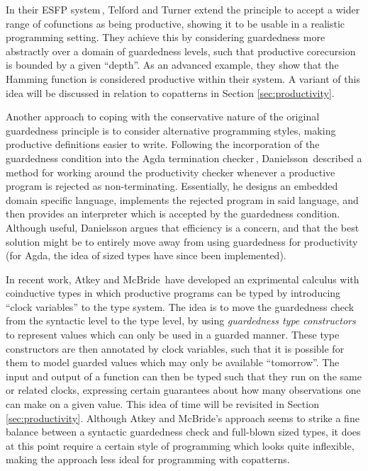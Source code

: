 In their ESFP system\,\citep{Telford97ensuringstreams,Telford98ensuringthe}, Telford and Turner extend the principle to accept a wider range of cofunctions as being productive, showing it to be usable in a realistic programming setting. They achieve this by considering guardedness more abstractly over a domain of guardedness levels, such that productive corecursion is bounded by a given ``depth''. As an advanced example, they show that the Hamming function is considered productive within their system. A variant of this idea will be discussed in relation to copatterns in Section \ref{sec:productivity}.

Another approach to coping with the conservative nature of the original guardedness principle is to consider alternative programming styles, making productive definitions easier to write. Following the incorporation of the guardedness condition into the Agda termination checker\,\citep{AltenkirchNAD10}, Danielsson\,\citep{Danielsson10beatingthe} described a method for working around the productivity checker whenever a productive program is rejected as non-terminating. Essentially, he designs an embedded domain specific language, implements the rejected program in said language, and then provides an interpreter which is accepted by the guardedness condition. Although useful, Danielsson argues that efficiency is a concern, and that the best solution might be to entirely move away from using guardedness for productivity (for Agda, the idea of sized types have since been implemented).

In recent work, Atkey and McBride\,\citep{AtkeyMcBride13} have developed an exprimental calculus with coinductive types in which productive programs can be typed by introducing ``clock variables'' to the type system. The idea is to move the guardedness check from the syntactic level to the type level, by using \emph{guardedness type constructors} to represent values which can only be used in a guarded manner. These type constructors are then annotated by clock variables, such that it is possible for them to model guarded values which may only be available ``tomorrow''. The input and output of a function can then be typed such that they run on the same or related clocks, expressing certain guarantees about how many observations one can make on a given value. This idea of time will be revisited in Section \ref{sec:productivity}. Although Atkey and McBride's approach seems to strike a fine balance between a syntactic guardedness check and full-blown sized types, it does at this point require a certain style of programming which looks quite inflexible, making the approach less ideal for programming with copatterns.


